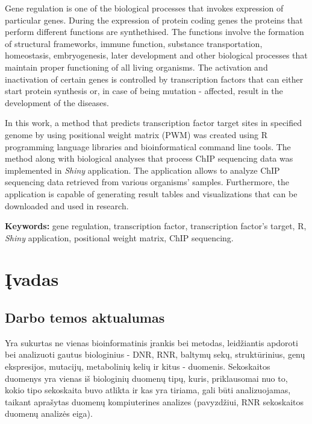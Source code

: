 \documentclass[12pt]{article}
\begin{document}
Gene regulation is one of the biological processes that invokes expression of
particular genes. During the expression of protein coding genes the proteins
that perform different functions are synthethised. The functions involve the
formation of structural frameworks, immune function, substance transportation,
homeostasis, embryogenesis, later development and other biological processes
that maintain proper functioning of all living organisms. The activation and
inactivation of certain genes is controlled by transcription factors that can
either start protein synthesis or, in case of being mutation - affected,
result in the development of the diseases.

In this work, a method that predicts transcription factor target sites in
specified genome by using positional weight matrix (PWM) was created using R
programming language libraries and bioinformatical command line tools. The
method along with biological analyses that process ChIP sequencing data was
implemented in \emph{Shiny} application. The application allows to analyze
ChIP sequencing data retrieved from various organisms' samples. Furthermore,
the application is capable of generating result tables and visualizations that
can be downloaded and used in research.

\hfill \break
\textbf{Keywords:} gene regulation, transcription factor, transcription factor's
target, R, \emph{Shiny} application, positional weight matrix, ChIP
sequencing.

\newpage


\section{Įvadas}
\subsection*{Darbo temos aktualumas}
Yra sukurtas ne vienas bioinformatinis įrankis\cite{BIOTOOLS} bei metodas,
leidžiantis apdoroti bei analizuoti gautus biologinius - DNR, RNR, baltymų sekų,
struktūrinius, genų ekspresijos, mutacijų, metabolinių kelių ir kitus -
duomenis. Sekoskaitos duomenys yra vienas iš biologinių duomenų tipų, kuris,
priklausomai nuo to, kokio tipo sekoskaita buvo atlikta ir kas yra tiriama, gali
būti analizuojamas, taikant aprašytas duomenų kompiuterines analizes
(pavyzdžiui, RNR sekoskaitos duomenų analizės eiga\cite{RNASEQ}).
\end{document}

